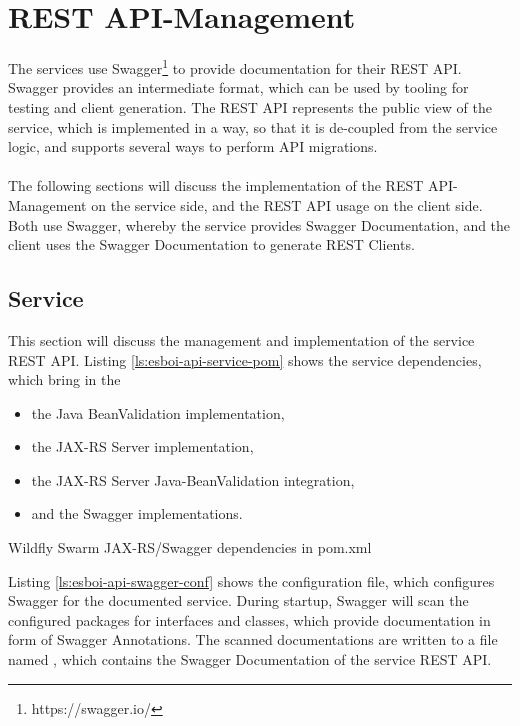 \section{REST API-Management}
\label{sec:esbi-api}
The services use Swagger\footnote{https://swagger.io/} to provide documentation for their REST API. Swagger provides an intermediate format, which can be used by tooling for testing and client generation. The REST API represents the public view of the service, which is implemented in a way, so that it is de-coupled from the service logic, and supports several ways to perform API migrations.
\\ \\
The following sections will discuss the implementation of the REST API-Management on the service side, and the REST API usage on the client side. Both use Swagger, whereby the service provides Swagger Documentation, and the client uses the Swagger Documentation to generate REST Clients.

\subsection{Service}
\label{sec:esbi-api-service}
This section will discuss the management and implementation of the service REST API. Listing \vref{ls:esboi-api-service-pom} shows the service dependencies, which bring in the 
\begin{itemize}
	\item the Java BeanValidation implementation, 
	\item the JAX-RS Server implementation,
	\item the JAX-RS Server Java-BeanValidation integration,
	\item and the Swagger implementations. 
\end{itemize}

\begin{listing}[h]
	\caption{Wildfly Swarm JAX-RS/Swagger dependencies in pom.xml}
	\label{ls:esboi-api-service-pom}
\end{listing}

Listing \vref{ls:esboi-api-swagger-conf} shows the  configuration file, which configures Swagger for the documented service. During startup, Swagger will scan the configured packages for interfaces and classes, which provide documentation in form of Swagger Annotations. The scanned documentations are written to a file named , which contains the Swagger Documentation of the service REST API.    

